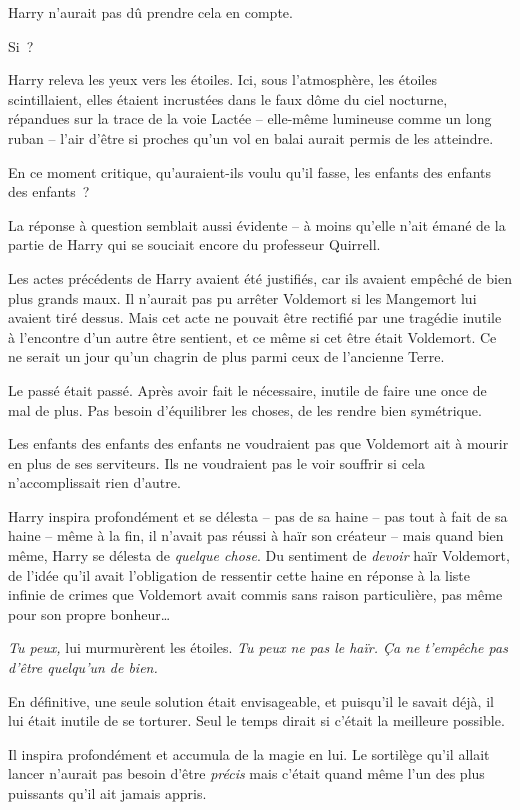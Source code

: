 Harry n'aurait pas dû prendre cela en compte.

Si~?

Harry releva les yeux vers les étoiles.
Ici, sous l'atmosphère, les étoiles scintillaient, elles étaient incrustées dans le faux dôme du ciel nocturne, répandues sur la trace de la voie Lactée -- elle-même lumineuse comme un long ruban -- l'air d'être si proches qu'un vol en balai aurait permis de les atteindre.

En ce moment critique, qu'auraient-ils voulu qu'il fasse, les enfants des enfants des enfants~?

La réponse à question semblait aussi évidente -- à moins qu'elle n'ait émané de la partie de Harry qui se souciait encore du professeur Quirrell.

Les actes précédents de Harry avaient été justifiés, car ils avaient empêché de bien plus grands maux.
Il n'aurait pas pu arrêter Voldemort si les Mangemort lui avaient tiré dessus.
Mais cet acte ne pouvait être rectifié par une tragédie inutile à l'encontre d'un autre être sentient, et ce même si cet être était Voldemort.
Ce ne serait un jour qu'un chagrin de plus parmi ceux de l'ancienne Terre.

Le passé était passé.
Après avoir fait le nécessaire, inutile de faire une once de mal de plus.
Pas besoin d'équilibrer les choses, de les rendre bien symétrique.

Les enfants des enfants des enfants ne voudraient pas que Voldemort ait à mourir en plus de ses serviteurs.
Ils ne voudraient pas le voir souffrir si cela n'accomplissait rien d'autre.

Harry inspira profondément et se délesta -- pas de sa haine -- pas tout à fait de sa haine -- même à la fin, il n'avait pas réussi à haïr son créateur -- mais quand bien même, Harry se délesta de \emph{quelque chose}.
Du sentiment de \emph{devoir} haïr Voldemort, de l'idée qu'il avait l'obligation de ressentir cette haine en réponse à la liste infinie de crimes que Voldemort avait commis sans raison particulière, pas même pour son propre bonheur…

\emph{Tu peux,} lui murmurèrent les étoiles.
\emph{Tu peux ne pas le haïr.
Ça ne t'empêche pas d'être quelqu'un de bien.}

En définitive, une seule solution était envisageable, et puisqu'il le savait déjà, il lui était inutile de se torturer.
Seul le temps dirait si c'était la meilleure possible.

Il inspira profondément et accumula de la magie en lui.
Le sortilège qu'il allait lancer n'aurait pas besoin d'être \emph{précis} mais c'était quand même l'un des plus puissants qu'il ait jamais appris.

